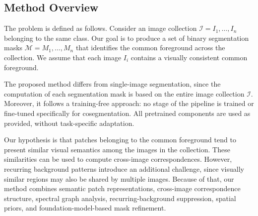 \subsection{Method Overview}

The problem is defined as follows. Consider an image collection $\mathcal{I} = {I_1, \dots, I_n}$ belonging to the same class. Our goal is to produce a set of binary segmentation masks $\mathcal{M} = {M_1, \dots, M_n}$ that identifies the common foreground across the collection. We assume that each image $I_i$ contains a visually consistent common foreground.

The proposed method differs from single-image segmentation, since the computation of each segmentation mask is based on the entire image collection $\mathcal{I}$. Moreover, it follows a training-free approach: no stage of the pipeline is trained or fine-tuned specifically for cosegmentation. All pretrained components are used as provided, without task-specific adaptation.

Our hypothesis is that patches belonging to the common foreground tend to present similar visual semantics among the images in the collection. These similarities can be used to compute cross-image correspondences. However, recurring background patterns introduce an additional challenge, since visually similar regions may also be shared by multiple images. Because of that, our method combines semantic patch representations, cross-image correspondence structure, spectral graph analysis, recurring-background suppression, spatial priors, and foundation-model-based mask refinement.

